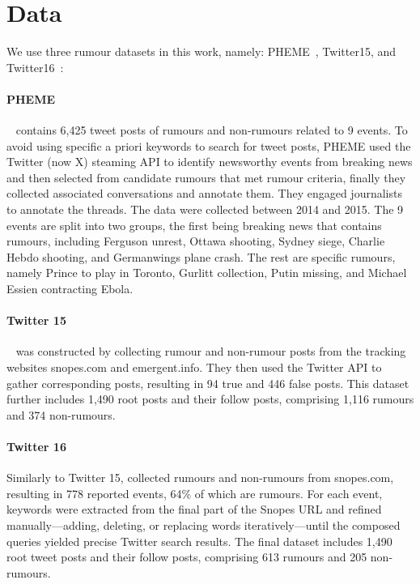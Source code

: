 \section{Data} \label{sec:data}
We use three rumour datasets in this work, namely: PHEME~\citep{pheme2015,kochkina-etal-2018-one}, Twitter15, and Twitter16~\citep{ma-etal-2017-detect}:

\paragraph{PHEME}~\citet{pheme2015} contains 6,425 tweet posts of rumours and non-rumours related to 9 events. To avoid using specific a priori keywords to search for tweet posts, PHEME used the Twitter (now X) steaming API to identify newsworthy events from breaking news and then selected from candidate rumours that met rumour criteria, finally they collected associated conversations and annotate them. They engaged journalists to annotate the threads. The data were collected between 2014 and 2015. The 9 events are split into two groups, the first being breaking news that contains rumours, including Ferguson unrest, Ottawa shooting, Sydney siege, Charlie Hebdo shooting, and Germanwings plane crash. The rest are specific rumours, namely Prince to play in Toronto, Gurlitt collection, Putin missing, and Michael Essien contracting Ebola.

\paragraph{Twitter 15}~\citet{twitter15} was constructed by collecting rumour and non-rumour posts from the tracking websites snopes.com and emergent.info. They then used the Twitter API to gather corresponding posts, resulting in 94 true and 446 false posts. This dataset further includes 1,490 root posts and their follow posts, comprising 1,116 rumours and 374 non-rumours.

\paragraph{Twitter 16}
Similarly to Twitter 15, \citet{twitter16} collected rumours and non-rumours from snopes.com, resulting in 778 reported events, 64\% of which are rumours. For each event, keywords were extracted from the final part of the Snopes URL and refined manually---adding, deleting, or replacing words iteratively---until the composed queries yielded precise Twitter search results. The final dataset includes 1,490 root tweet posts and their follow posts, comprising 613 rumours and 205 non-rumours.

